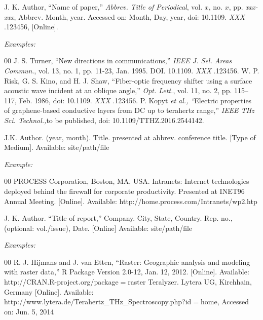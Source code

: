 \documentclass{ieeetj}
\begin{document}

\noindent J. K. Author, ``Name of paper,'' {\it Abbrev. Title of Periodical}, vol. $x$, no. $x$, pp. {\it xxx-xxx}, Abbrev. Month, year.
Accessed on: Month, Day, year, doi:  {10.1109.} {{\it
XXX}} {.123456}, [Online].

{\it Examples:}

\begin{thebibliography}{00}
 J. S. Turner, ``New directions in communications,'' {\it IEEE J. Sel. Areas Commun}., vol. 13, no. 1, pp. 11-23, Jan. 1995. DOI.  {10.1109.} {{\it XXX}} {.123456}.
 W. P. Risk, G. S. Kino, and H. J. Shaw, ``Fiber-optic frequency shifter using a surface acoustic wave incident at an oblique angle,'' {\it Opt. Lett.}, vol. 11, no. 2, pp. 115--117, Feb. 1986, doi: {10.1109.} {{\it XXX}} {.123456}.
 P. Kopyt {\it \textit{et al.}, ``}Electric properties of graphene-based conductive layers from DC up to terahertz range,'' {\it IEEE THz Sci. Technol.,}to be published, doi:  {10.1109/TTHZ.2016.2544142}.
\end{thebibliography}


\noindent J.K. Author. (year, month). Title. presented at abbrev. conference title.
[Type of Medium]. Available: site/path/file

{\it Example:}

\begin{thebibliography}{00}
 PROCESS Corporation, Boston, MA, USA. Intranets: Internet technologies deployed behind the firewall for corporate productivity. Presented at INET96 Annual Meeting. [Online]. Available:  {http://home.process.com/Intranets/wp2.htp}
\end{thebibliography}


\noindent J. K. Author. ``Title of report,'' Company. City, State, Country. Rep. no.,
(optional: vol./issue), Date. [Online] Available:
{site/path/file}

{\it Examples:}

\begin{thebibliography}{00}
 R. J. Hijmans and J. van Etten, ``Raster: Geographic analysis and modeling with raster data,'' R Package Version 2.0-12, Jan. 12, 2012. [Online]. Available:  {http://CRAN.R-project.org/package$=$raster} {}
 Teralyzer. Lytera UG, Kirchhain, Germany [Online]. Available: http://www.lytera.de/Terahertz\_THz\_Spectroscopy.php?id$=$home, Accessed on: Jun. 5, 2014
\end{thebibliography}
\end{document}
